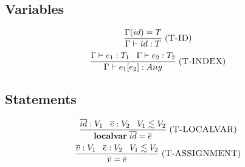 \documentclass[12pt]{article}
\newcommand{\mylabel}[1]{\; (\textsc{#1})}
\newcommand{\env}{\Gamma}
\begin{document}
\subsection{Variables}

\[
\frac{\env(id) = T}
     {\env \vdash id : T}
\mylabel{T-ID}
\]
\[
\frac{\env \vdash e_{1}:T_{1} \;\;\; \env \vdash e_{2}:T_{2}}
     {\env \vdash e_{1}[e_{2}] : Any}
\mylabel{T-INDEX}
\]

\subsection{Statements}

\[
\frac{\overline{id}:V_{1} \;\;\; \overline{e}:V_2 \;\;\; V_{1} \lesssim V_{2}}
     {\textbf{localvar} \; \overline{id} = \overline{e}}
\mylabel{T-LOCALVAR}
\]
\[
\frac{\overline{v}:V_{1} \;\;\; \overline{e}:V_2 \;\;\; V_{1} \lesssim V_{2}}
     {\overline{v} = \overline{e}}
\mylabel{T-ASSIGNMENT}
\]
\end{document}
